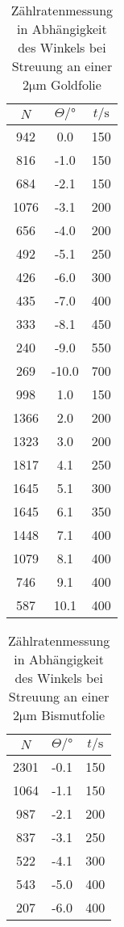 \begin{table}
    \centering
    \caption{Zählratenmessung in Abhängigkeit des Winkels bei Streuung an einer $2\si{\micro\meter}$ Goldfolie}
    \label{tab:streu_gold}
    \begin{tabular}{ccc}
        \toprule
        $N$ & $\Theta/°$ & $t/\si{\second}$\\
        \midrule
        942     &0.0     &150\\
        816     &-1.0    &150\\
        684     &-2.1    &150\\
        1076    &-3.1    &200\\
        656     &-4.0    &200\\
        492     &-5.1    &250\\
        426     &-6.0    &300\\
        435     &-7.0    &400\\
        333     &-8.1    &450\\
        240     &-9.0    &550\\
        269     &-10.0   &700\\
        998     &1.0     &150\\
        1366    &2.0     &200\\
        1323    &3.0     &200\\
        1817    &4.1     &250\\
        1645    &5.1     &300\\
        1645    &6.1     &350\\
        1448    &7.1     &400\\
        1079    &8.1     &400\\
        746     &9.1     &400\\
        587     &10.1    &400\\
        \bottomrule
    \end{tabular}
\end{table}

\begin{table}
    \centering
    \caption{Zählratenmessung in Abhängigkeit des Winkels bei Streuung an einer $2\si{\micro\meter}$ Bismutfolie}
    \label{tab:streu_bismut}
    \begin{tabular}{ccc}
        \toprule
        $N$ & $\Theta/°$ & $t/\si{\second}$\\
        \midrule
        2301    &-0.1    &150\\
        1064    &-1.1    &150\\
        987     &-2.1    &200\\
        837     &-3.1    &250\\
        522     &-4.1    &300\\
        543     &-5.0    &400\\
        207     &-6.0    &400\\
        \bottomrule
    \end{tabular}
\end{table}

